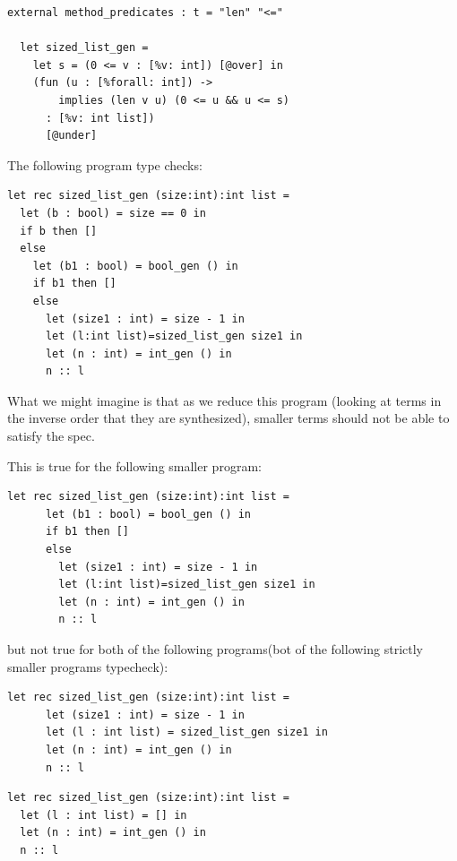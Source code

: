\documentclass[review, sigplan]{acmart}
\begin{document}
\begin{lstlisting}[language=caml, basicstyle=\small\ttfamily]
  external method_predicates : t = "len" "<="

  let sized_list_gen =
    let s = (0 <= v : [%v: int]) [@over] in
    (fun (u : [%forall: int]) ->
        implies (len v u) (0 <= u && u <= s)
      : [%v: int list])
      [@under]
\end{lstlisting}

The following program type checks:

\begin{lstlisting}[language=caml, basicstyle=\small\ttfamily]
let rec sized_list_gen (size:int):int list =
  let (b : bool) = size == 0 in
  if b then []
  else
    let (b1 : bool) = bool_gen () in
    if b1 then []
    else
      let (size1 : int) = size - 1 in
      let (l:int list)=sized_list_gen size1 in
      let (n : int) = int_gen () in
      n :: l
\end{lstlisting}

What we might imagine is that as we reduce this program (looking at terms in the
inverse order that they are synthesized), smaller terms should not be able to
satisfy the spec.

This is true for the following smaller program:
\begin{lstlisting}[language=caml, basicstyle=\small\ttfamily]
  let rec sized_list_gen (size:int):int list =
      let (b1 : bool) = bool_gen () in
      if b1 then []
      else
        let (size1 : int) = size - 1 in
        let (l:int list)=sized_list_gen size1 in
        let (n : int) = int_gen () in
        n :: l
  \end{lstlisting}

but not true for both of the following programs(bot of the following strictly
smaller programs typecheck):

\begin{lstlisting}[language=caml, basicstyle=\small\ttfamily]
let rec sized_list_gen (size:int):int list =
      let (size1 : int) = size - 1 in
      let (l : int list) = sized_list_gen size1 in
      let (n : int) = int_gen () in
      n :: l
\end{lstlisting}

\begin{lstlisting}[language=caml, basicstyle=\small\ttfamily]
let rec sized_list_gen (size:int):int list =
  let (l : int list) = [] in
  let (n : int) = int_gen () in
  n :: l
\end{lstlisting}
\end{document}
